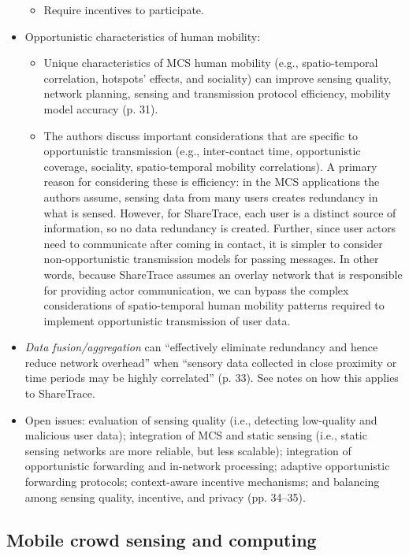 \begin{itemize}
\begin{itemize}
	\item Require incentives to participate.
	\end{itemize}
\item Opportunistic characteristics of human mobility:
	\begin{itemize}
	\item Unique characteristics of MCS human mobility (e.g., spatio-temporal correlation, hotspots' effects, and sociality) can improve sensing quality, network planning, sensing and transmission protocol efficiency, mobility model accuracy (p. 31).
	\item The authors discuss important considerations that are specific to opportunistic transmission (e.g., inter-contact time, opportunistic coverage, sociality, spatio-temporal mobility correlations). A primary reason for considering these is efficiency: in the MCS applications the authors assume, sensing data from many users creates redundancy in what is sensed. However, for ShareTrace, each user is a distinct source of information, so no data redundancy is created. Further, since user actors need to communicate after coming in contact, it is simpler to consider non-opportunistic transmission models for passing messages. In other words, because ShareTrace assumes an overlay network that is responsible for providing actor communication, we can bypass the complex considerations of spatio-temporal human mobility patterns required to implement opportunistic transmission of user data.
	\end{itemize}
\item \emph{Data fusion/aggregation} can ``effectively eliminate redundancy and hence reduce network overhead'' when ``sensory data collected in close proximity or time periods may be highly correlated'' (p. 33). See \cite{Lane2010} notes on how this applies to ShareTrace.
\item Open issues: evaluation of sensing quality (i.e., detecting low-quality and malicious user data); integration of MCS and static sensing (i.e., static sensing networks are more reliable, but less scalable); integration of opportunistic forwarding and in-network processing; adaptive opportunistic forwarding protocols; context-aware incentive mechanisms; and balancing among sensing quality, incentive, and privacy (pp. 34--35).
\end{itemize}

\subsection{Mobile crowd sensing and computing}
